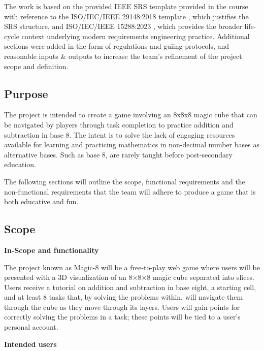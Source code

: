 \documentclass[12pt]{article}
\begin{document}
The work is based on the provided IEEE SRS template provided in the course \citet{ISOIECIEEE29148_2018} with reference to the ISO/IEC/IEEE 29148:2018 template \citet{ISOIECIEEE29148_2018}, which justifies the SRS structure, 
and ISO/IEC/IEEE 15288:2023 \citet{ISOIECIEEE15288_2023}, which provides the broader life-cycle context underlying modern requirements engineering practice. Additional sections were added in the form of regulations and guiing protocols, and reasonable inputs \& outputs to increase the team's refinement of the project scope and definition.

\subsection{Purpose}

The project is intended to create a game involving an 8x8x8 magic cube that can be navigated by players through task completion to practice addition and subtraction in base 8.
The intent is to solve the lack of engaging resources available for learning and practicing mathematics in non-decimal number bases as alternative bases. Such as base 8, are rarely taught before post-secondary education.

The following sections will outline the scope, functional requirements and the non-functional requirements that the team will adhere to produce a game that is both educative and fun.

\subsection{Scope}
\label{subsec:scope}

\textbf{In-Scope and functionality}

The project known as Magic-8 will be a free-to-play web game where users will be presented with a 3D visualization of an 8$\times$8$\times$8 magic cube separated into slices.
Users receive a tutorial on addition and subtraction in base eight, a starting cell, and at least 8 tasks that, by solving the problems within, will navigate them through the cube as they move through its layers.
Users will gain points for correctly solving the problems in a task; these points will be tied to a user's personal account.

\textbf{Intended users}
\end{document}
